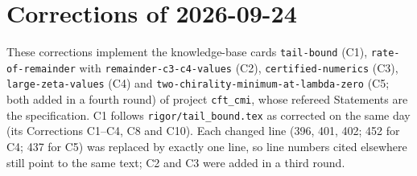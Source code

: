 \documentclass[11pt]{article}
\theoremstyle{accent}
\theoremstyle{definition}
\begin{document}


\section*{Corrections of 2026-09-24}
{\sloppy
These corrections implement the knowledge-base cards \texttt{tail-bound} (C1),
\texttt{rate-of-remainder} with \texttt{remainder-c3-c4-values} (C2), \texttt{certified-numerics}
(C3), \texttt{large-zeta-values} (C4) and \texttt{two-chirality-minimum-at-lambda-zero} (C5; both added in a fourth round) of project \texttt{cft\_cmi},
whose refereed Statements are the specification.  C1 follows \texttt{rigor/tail\_bound.tex} as
corrected on the same day (its Corrections C1--C4, C8 and C10).  Each changed line (396, 401, 402; 452 for C4; 437 for C5) was replaced by
exactly one line, so line numbers cited elsewhere still point to the same text; C2 and C3 were added
in a third round.

}
\end{document}
